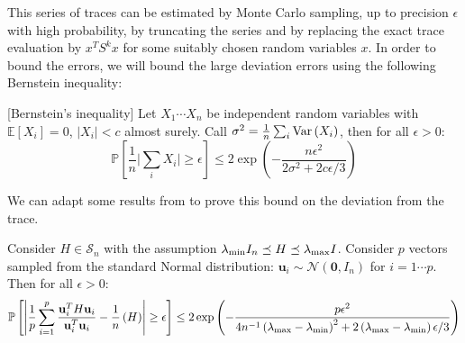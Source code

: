 This series of traces can be estimated by Monte Carlo sampling, up
to precision $\epsilon$ with high probability, by truncating the
series and by replacing the exact trace evaluation by $x^{T}S^{k}x$
for some suitably chosen random variables $x$. In order to bound
the errors, we will bound the large deviation errors using the following
Bernstein inequality:
\begin{lemma}
{[}Bernstein's inequality{]} \label{lem:bernstein} Let $X_{1}\cdots X_{n}$
be independent random variables with $\mathbb{E}\left[X_{i}\right]=0$,
$\left|X_{i}\right|<c$ almost surely. Call $\sigma^{2}=\frac{1}{n}\sum_{i}\text{\textnormal{Var}}\left(X_{i}\right)$,
then for all $\epsilon>0$: 
\[
\mathbb{P}\left[\frac{1}{n}\Big|\sum_{i}X_{i}\Big|\geq\epsilon\right]\leq2\exp\left(-\frac{n\epsilon^{2}}{2\sigma^{2}+2c\epsilon/3}\right)
\]

\end{lemma}
We can adapt some results from \cite{Barry1999} to prove this bound
on the deviation from the trace.
\begin{lemma}
\label{lem:bernstein-trace}Consider $H\in\mathcal{S}_{n}$ with the
assumption $\lambda_{\text{\textnormal{min}}}I_{n}\preceq H\preceq\lambda_{\text{\textnormal{max}}}I$.
Consider $p$ vectors sampled from the standard Normal distribution:
$\mathbf{u}_{i}\sim\mathcal{N}\left(\mathbf{0},I_{n}\right)$ for
$i=1\cdots p$. Then for all $\epsilon>0$: 
\[
\mathbb{P}\left[\left|\frac{1}{p}\sum_{i=1}^{p}\frac{\mathbf{u}_{i}^{T}H\mathbf{u}_{i}}{\mathbf{u}_{i}^{T}\mathbf{u}_{i}}-\frac{1}{n}\left(H\right)\right|\geq\epsilon\right]\leq2\exp\left(-\frac{p\epsilon^{2}}{4n^{-1}\left(\lambda_{\max}-\lambda_{\min}\right)^{2}+2\left(\lambda_{\max}-\lambda_{\min}\right)\epsilon/3}\right)
\]
\end{lemma}

